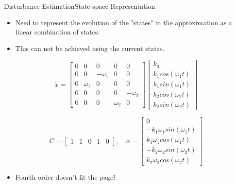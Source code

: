 
\begin{frame}{Disturbance Estimation}{State-space Representation}
	\begin{itemize}
		\item Need to represent the evolution of the "states" in the approximation as a linear combination of states.
		\item This can not be achieved using the current states.   
	\end{itemize}
	
\begin{equation} \label{eq:consump_A}
	\dot{x} = 
	\begin{bmatrix}
		0 & 0 & 0 & 0 & 0 \\
		0 & 0 & -\omega_1 & 0 & 0 \\
		0 & \omega_1 & 0 & 0 & 0 \\
		0 & 0 & 0 & 0 & -\omega_2 \\
		0 & 0 & 0 & \omega_2 & 0 
	\end{bmatrix}
	\begin{bmatrix}
		k_0 \\
		k_1 cos(\omega_1 t) \\
		k_1 sin(\omega_1 t) \\
		k_2 cos(\omega_2 t) \\
		k_2 sin(\omega_2 t) 
	\end{bmatrix}
\end{equation}

\begin{equation}
	C = \begin{bmatrix} 1 & 1 & 0 & 1 & 0 \end{bmatrix}, \quad 
	\dot{x} = \begin{bmatrix}0 \\ -k_1\omega_1sin(\omega_1 t) \\ k_1\omega_1 cos(\omega_1 t) \\ -k_2\omega_2sin(\omega_2 t) \\ k_2\omega_2 cos(\omega_2 t)  \end{bmatrix} 
\end{equation}

	\begin{itemize}
	\item Fourth order doesn't fit the page!
\end{itemize}
\end{frame}



